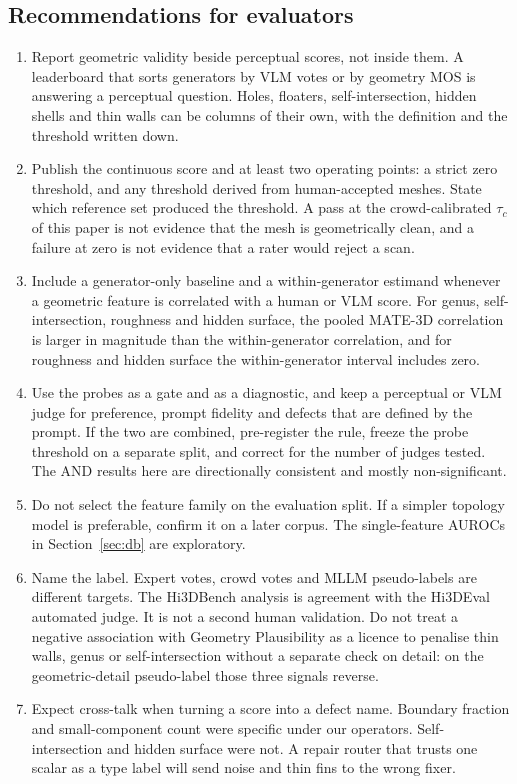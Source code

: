 \subsection{Recommendations for evaluators}
\begin{enumerate}
  \item Report geometric validity beside perceptual scores, not inside them.
  A leaderboard that sorts generators by VLM votes or by geometry MOS is answering a perceptual question.
  Holes, floaters, self-intersection, hidden shells and thin walls can be columns of their own, with the definition and the threshold written down.
  \item Publish the continuous score and at least two operating points: a strict zero threshold, and any threshold derived from human-accepted meshes.
  State which reference set produced the threshold.
  A pass at the crowd-calibrated \(\tau_c\) of this paper is not evidence that the mesh is geometrically clean, and a failure at zero is not evidence that a rater would reject a scan.
  \item Include a generator-only baseline and a within-generator estimand whenever a geometric feature is correlated with a human or VLM score.
  For genus, self-intersection, roughness and hidden surface, the pooled MATE-3D correlation is larger in magnitude than the within-generator correlation, and for roughness and hidden surface the within-generator interval includes zero.
  \item Use the probes as a gate and as a diagnostic, and keep a perceptual or VLM judge for preference, prompt fidelity and defects that are defined by the prompt.
  If the two are combined, pre-register the rule, freeze the probe threshold on a separate split, and correct for the number of judges tested.
  The AND results here are directionally consistent and mostly non-significant.
  \item Do not select the feature family on the evaluation split.
  If a simpler topology model is preferable, confirm it on a later corpus.
  The single-feature AUROCs in Section~\ref{sec:db} are exploratory.
  \item Name the label. Expert votes, crowd votes and MLLM pseudo-labels are different targets.
  The Hi3DBench analysis is agreement with the Hi3DEval automated judge.
  It is not a second human validation.
  Do not treat a negative association with Geometry Plausibility as a licence to penalise thin walls, genus or self-intersection without a separate check on detail: on the geometric-detail pseudo-label those three signals reverse.
  \item Expect cross-talk when turning a score into a defect name.
  Boundary fraction and small-component count were specific under our operators.
  Self-intersection and hidden surface were not.
  A repair router that trusts one scalar as a type label will send noise and thin fins to the wrong fixer.
\end{enumerate}
